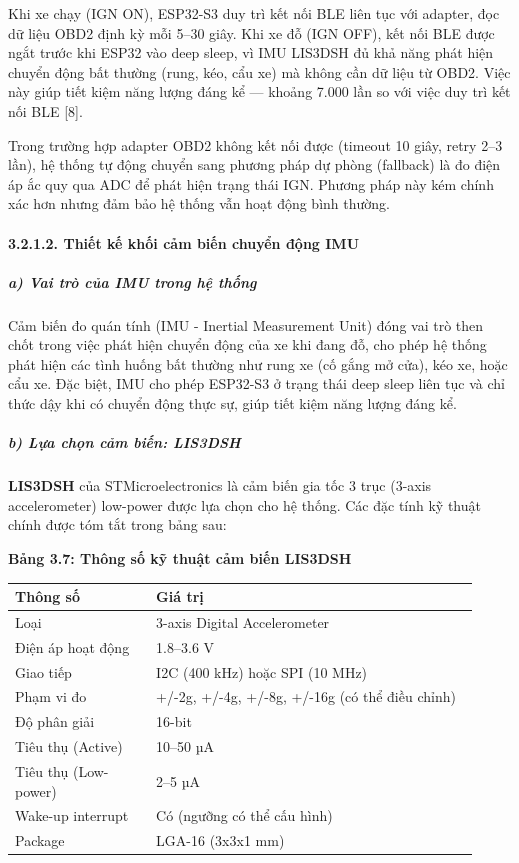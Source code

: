 \documentclass[13pt,a4paper]{extarticle}
\newcounter{none} %
\newcommand{\thesislongtableorignewline}{}
\let\thesislongtableorignewline\\
\renewcommand{\\}{\thesislongtableorignewline\hline}%
\let\\\thesislongtableorignewline
\newcommand{\thesistabletitle}[1]{%
  \begin{center}\textbf{#1}\end{center}%
}
\begin{document}
Khi xe chạy (IGN ON), ESP32-S3 duy trì kết nối BLE liên tục với adapter,
đọc dữ liệu OBD2 định kỳ mỗi 5--30 giây. Khi xe đỗ (IGN OFF), kết nối
BLE được ngắt trước khi ESP32 vào deep sleep, vì IMU LIS3DSH đủ khả năng
phát hiện chuyển động bất thường (rung, kéo, cẩu xe) mà không cần dữ
liệu từ OBD2. Việc này giúp tiết kiệm năng lượng đáng kể --- khoảng
7.000 lần so với việc duy trì kết nối BLE {[}8{]}.

Trong trường hợp adapter OBD2 không kết nối được (timeout 10 giây, retry
2--3 lần), hệ thống tự động chuyển sang phương pháp dự phòng (fallback)
là đo điện áp ắc quy qua ADC để phát hiện trạng thái IGN. Phương pháp
này kém chính xác hơn nhưng đảm bảo hệ thống vẫn hoạt động bình thường.

\paragraph{3.2.1.2. Thiết kế khối cảm biến chuyển động
IMU}\label{3212-thiux1ebft-kux1ebf-muxf4-ux111un-cux1ea3m-biux1ebfn-chuyux1ec3n-ux111ux1ed9ng-imu}

\subparagraph{a) Vai trò của IMU trong hệ
thống}\label{a-vai-truxf2-cux1ee7a-imu-trong-hux1ec7-thux1ed1ng}

Cảm biến đo quán tính (IMU - Inertial Measurement Unit) đóng vai trò
then chốt trong việc phát hiện chuyển động của xe khi đang đỗ, cho phép
hệ thống phát hiện các tình huống bất thường như rung xe (cố gắng mở
cửa), kéo xe, hoặc cẩu xe. Đặc biệt, IMU cho phép ESP32-S3 ở trạng thái
deep sleep liên tục và chỉ thức dậy khi có chuyển động thực sự, giúp
tiết kiệm năng lượng đáng kể.

\subparagraph{b) Lựa chọn cảm biến:
LIS3DSH}\label{b-lux1ef1a-chux1ecdn-cux1ea3m-biux1ebfn-lis3dsh}

\textbf{LIS3DSH} của STMicroelectronics là cảm biến gia tốc 3 trục
(3-axis accelerometer) low-power được lựa chọn cho hệ thống. Các đặc
tính kỹ thuật chính được tóm tắt trong bảng sau:

\thesistabletitle{Bảng 3.7: Thông số kỹ thuật cảm biến LIS3DSH}

{\def\LTcaptype{none} %
\begin{longtable}{|p{0.28\linewidth}|p{0.64\linewidth}|}
\hline \textbf{Thông số} & \textbf{Giá trị} \\
\hline
\endhead
\hline
\endlastfoot
Loại & 3-axis Digital Accelerometer \\
Điện áp hoạt động & 1.8--3.6 V \\
Giao tiếp & I2C (400 kHz) hoặc SPI (10 MHz) \\
Phạm vi đo & +/-2g, +/-4g, +/-8g, +/-16g (có thể điều chỉnh) \\
Độ phân giải & 16-bit \\
Tiêu thụ (Active) & 10--50 µA \\
Tiêu thụ (Low-power) & 2--5 µA \\
Wake-up interrupt & Có (ngưỡng có thể cấu hình) \\
Package & LGA-16 (3x3x1 mm) \\
\end{longtable}
}
\end{document}
